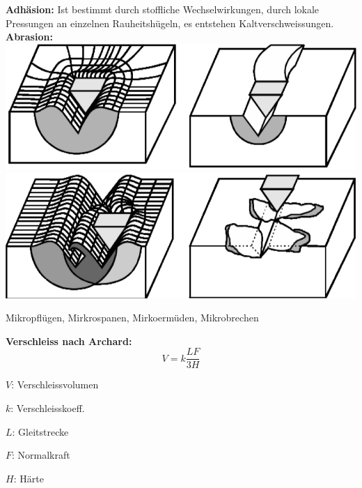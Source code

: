 \textbf{Adhäsion:} Ist bestimmt durch stoffliche Wechselwirkungen, durch lokale Pressungen an einzelnen Rauheitshügeln, es entstehen Kaltverschweissungen.\\

\textbf{Abrasion:}\\

\includegraphics[width=0.5 \linewidth]{src/images/Verschleiss1.jpeg}
\includegraphics[width=0.5 \linewidth]{src/images/Verschleiss2.jpeg}

Mikropflügen, Mirkrospanen, Mirkoermüden, Mikrobrechen\\


\begin{minipage}{0.5\linewidth}
    \textbf{Verschleiss nach Archard:}\\
    \[
    \boxed{     
        V = k \frac{LF}{3H}
    }
    \]
\end{minipage}
\begin{minipage}{0.5\linewidth}
    \begin{tiny}
    \item $V$: Verschleissvolumen
    \item $k$: Verschleisskoeff.
    \item $L$: Gleitstrecke
    \item $F$: Normalkraft
    \item $H$: Härte
    \end{tiny}
\end{minipage}
\vspace{1mm}

